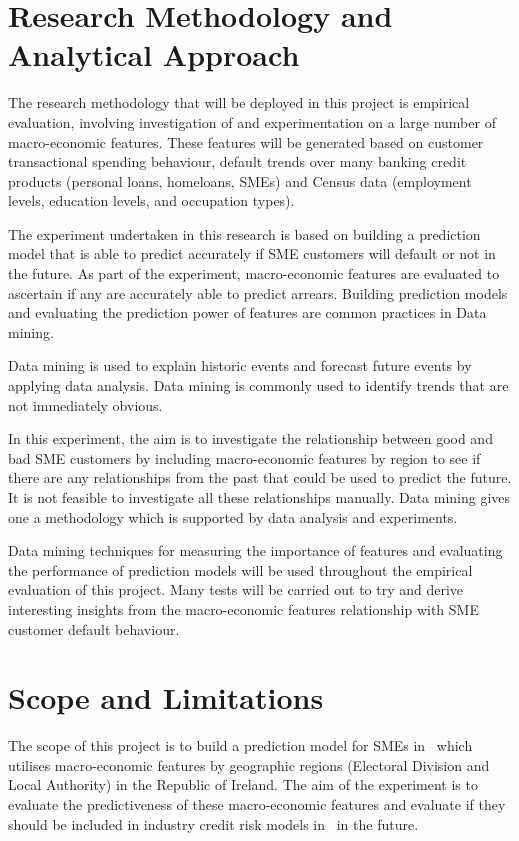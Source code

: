 \section{Research Methodology and Analytical Approach}

The research methodology that will be deployed in this project is empirical evaluation, involving investigation of and experimentation on a large number of macro-economic features. These features will be generated based on customer transactional spending behaviour, default trends over many banking credit products (personal loans, homeloans, SMEs) and Census data (employment levels, education levels, and occupation types).   

The experiment undertaken in this research is based on building a prediction model that is able to predict accurately if SME customers will default or not in the future. As part of the experiment, macro-economic features are evaluated to ascertain if any are accurately able to predict arrears. Building prediction models and evaluating the prediction power of features are common practices in Data mining.

Data mining is used to explain historic events and forecast future events by applying data analysis. Data mining is commonly used to identify trends that are not immediately obvious. 

In this experiment, the aim is to investigate the relationship between good and bad SME customers by including macro-economic features by region to see if there are any relationships from the past that could be used to predict the future. It is not feasible to investigate all these relationships manually. Data mining gives one a methodology which is supported by data analysis and experiments. 

Data mining techniques for measuring the importance of features and evaluating the performance of prediction models will be used throughout the empirical evaluation of this project. Many tests will be carried out to try and derive interesting insights from the macro-economic features relationship with SME customer default behaviour.

\section{Scope and Limitations}
The scope of this project is to build a prediction model for SMEs in \subjectname\  which utilises macro-economic features by geographic regions (Electoral Division and Local Authority) in the Republic of Ireland. The aim of the experiment is to evaluate the predictiveness of these macro-economic features and evaluate if they should be included in industry credit risk models in \subjectname\ in the future.

